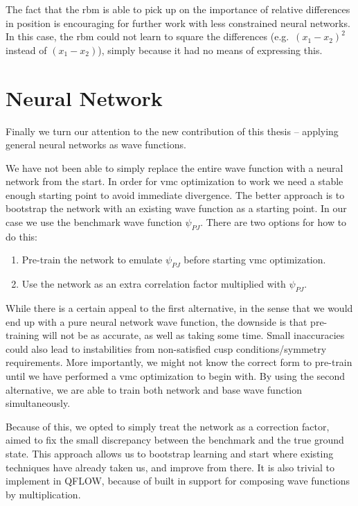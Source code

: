 \documentclass[Thesis.tex]{subfiles}
\begin{document}
The fact that the \gls{rbm} is able to pick up on the importance of relative
differences in position is encouraging for further work with less constrained
neural networks. In this case, the \gls{rbm} could not learn to square the differences
(e.g.\ $(x_1 - x_2)^2$ instead of $(x_1-x_2)$), simply because it had no means
of expressing this.

\section{Neural Network}

Finally we turn our attention to the new contribution of this thesis -- applying
general neural networks as wave functions.

We have not been able to simply replace the entire wave function with a
neural network from the start. In order for \gls{vmc} optimization to work we need a
stable enough starting point to avoid immediate divergence. The better approach
is to bootstrap the network with an existing wave function as a starting point.
In our case we use the benchmark wave function $\psi_{PJ}$. There are two
options for how to do this:

\begin{enumerate}
\item Pre-train the network to emulate $\psi_{PJ}$ before starting \gls{vmc}
  optimization.
\item Use the network as an extra correlation factor multiplied with $\psi_{PJ}$.
\end{enumerate}
While there is a certain appeal to the first alternative, in the
sense that we would end up with a pure neural network wave function, the
downside is that pre-training will not be as accurate, as well as taking
some time. Small inaccuracies could also lead to instabilities from non-satisfied
cusp conditions/symmetry requirements. More importantly, we might
not know the correct form to pre-train until we have performed a \gls{vmc}
optimization to begin with. By using the second alternative, we are able to
train both network and base wave function simultaneously.

Because of this, we opted to simply treat the network as a correction factor,
aimed to fix the small discrepancy between the benchmark and the true ground
state. This approach allows us to bootstrap learning and start where existing
techniques have already taken us, and improve from there. It is also trivial to
implement in QFLOW, because of built in support for composing wave functions by
multiplication.
\end{document}
